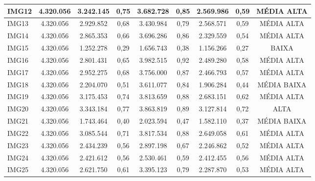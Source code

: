 \begin{table}[htbp]
\begin{tabularx}{\textwidth}{X|C|C|C|C|C|C|C|C}
        IMG12 & 4.320.056 & 3.242.145 & 0,75 & 3.682.728 & 0,85 & 2.569.986 & 0,59 & MÉDIA ALTA \\ \hline
        IMG13 & 4.320.056 & 2.929.852 & 0,68 & 3.430.984 & 0,79 & 2.568.571 & 0,59 & MÉDIA ALTA \\ \hline
        IMG14 & 4.320.056 & 2.865.353 & 0,66 & 3.696.286 & 0,86 & 2.329.559 & 0,54 & MÉDIA ALTA \\ \hline
        IMG15 & 4.320.056 & 1.252.278 & 0,29 & 1.656.743 & 0,38 & 1.156.266 & 0,27 & BAIXA \\ \hline
        IMG16 & 4.320.056 & 2.801.431 & 0,65 & 3.982.515 & 0,92 & 2.489.280 & 0,58 & MÉDIA ALTA \\ \hline
        IMG17 & 4.320.056 & 2.952.275 & 0,68 & 3.756.000 & 0,87 & 2.466.793 & 0,57 & MÉDIA ALTA \\ \hline
        IMG18 & 4.320.056 & 2.204.070 & 0,51 & 3.611.077 & 0,84 & 1.906.284 & 0,44 & MÉDIA BAIXA \\ \hline
        IMG19 & 4.320.056 & 3.175.453 & 0,74 & 3.813.659 & 0,88 & 2.683.151 & 0,62 & MÉDIA ALTA \\ \hline
        IMG20 & 4.320.056 & 3.343.184 & 0,77 & 3.863.819 & 0,89 & 3.127.814 & 0,72 & ALTA \\ \hline
        IMG21 & 4.320.056 & 1.743.464 & 0,40 & 2.023.594 & 0,47 & 1.582.110 & 0,37 & MÉDIA BAIXA \\ \hline
        IMG22 & 4.320.056 & 3.085.544 & 0,71 & 3.817.534 & 0,88 & 2.649.058 & 0,61 & MÉDIA ALTA \\ \hline
        IMG23 & 4.320.056 & 2.434.239 & 0,56 & 2.897.198 & 0,67 & 2.246.862 & 0,52 & MÉDIA ALTA \\ \hline
        IMG24 & 4.320.056 & 2.421.612 & 0,56 & 2.530.461 & 0,59 & 2.412.455 & 0,56 & MÉDIA ALTA \\ \hline
        IMG25 & 4.320.056 & 2.621.750 & 0,61 & 3.395.123 & 0,79 & 2.287.870 & 0,53 & MÉDIA ALTA \\

    \hline
    
\end{tabularx}

\autoriaPropria

\end{table}

